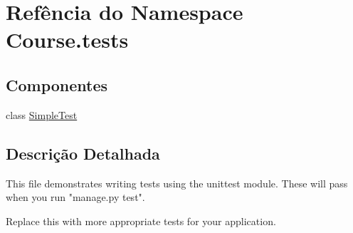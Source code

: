 \hypertarget{namespaceCourse_1_1tests}{\section{Refência do Namespace Course.\-tests}
\label{namespaceCourse_1_1tests}
}
\subsection*{Componentes}
\begin{DoxyCompactItemize}
\item 
class \hyperlink{classCourse_1_1tests_1_1SimpleTest}{Simple\-Test}
\end{DoxyCompactItemize}


\subsection{Descrição Detalhada}
\begin{DoxyVerb}This file demonstrates writing tests using the unittest module. These will pass
when you run "manage.py test".

Replace this with more appropriate tests for your application.
\end{DoxyVerb}
 